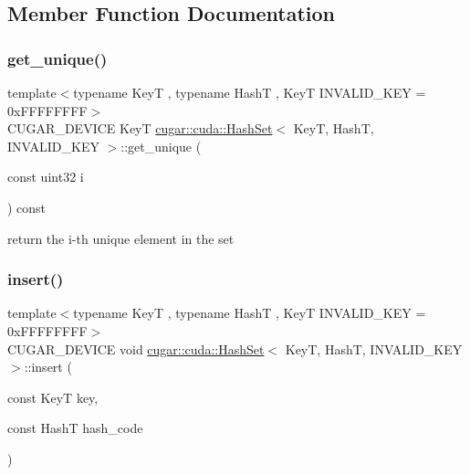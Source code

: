 \subsection{Member Function Documentation}
\mbox{\label{structcugar_1_1cuda_1_1_hash_set_a50361944a81d2bf60e528de63313db32}} 
\subsubsection{\texorpdfstring{get\+\_\+unique()}{get\_unique()}}
{\footnotesize\ttfamily template$<$typename KeyT , typename HashT , KeyT I\+N\+V\+A\+L\+I\+D\+\_\+\+K\+EY = 0x\+F\+F\+F\+F\+F\+F\+FF$>$ \\
C\+U\+G\+A\+R\+\_\+\+D\+E\+V\+I\+CE KeyT \hyperlink{structcugar_1_1cuda_1_1_hash_set}{cugar\+::cuda\+::\+Hash\+Set}$<$ KeyT, HashT, I\+N\+V\+A\+L\+I\+D\+\_\+\+K\+EY $>$\+::get\+\_\+unique (\begin{DoxyParamCaption}\item[{const uint32}]{i }\end{DoxyParamCaption}) const\hspace{0.3cm}{\ttfamily [inline]}}

return the i-\/th unique element in the set \mbox{\label{structcugar_1_1cuda_1_1_hash_set_a417db996be279f2a91dc97390021c96f}} 
\subsubsection{\texorpdfstring{insert()}{insert()}}
{\footnotesize\ttfamily template$<$typename KeyT , typename HashT , KeyT I\+N\+V\+A\+L\+I\+D\+\_\+\+K\+EY = 0x\+F\+F\+F\+F\+F\+F\+FF$>$ \\
C\+U\+G\+A\+R\+\_\+\+D\+E\+V\+I\+CE void \hyperlink{structcugar_1_1cuda_1_1_hash_set}{cugar\+::cuda\+::\+Hash\+Set}$<$ KeyT, HashT, I\+N\+V\+A\+L\+I\+D\+\_\+\+K\+EY $>$\+::insert (\begin{DoxyParamCaption}\item[{const KeyT}]{key,  }\item[{const HashT}]{hash\+\_\+code }\end{DoxyParamCaption})\hspace{0.3cm}{\ttfamily [inline]}}

